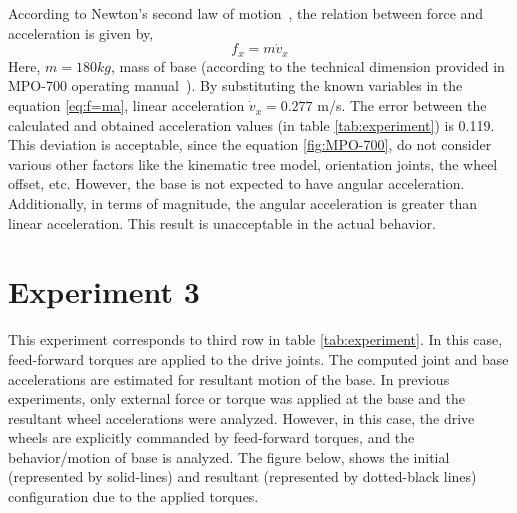 

According to Newton's second law of motion~\cite{newton1833philosophiae}, the relation between force and acceleration is given by,
\begin{equation}\label{eq:f=ma}
f_x = m \dot{v}_x
\end{equation}
Here, $m = 180kg$, mass of base (according to the technical dimension provided in MPO-700 operating manual~\cite{MPO700}). By substituting the known variables in the equation \ref{eq:f=ma}, linear acceleration $\dot{v}_x = 0.277$ m/s. The error between the calculated and obtained acceleration values (in table \ref{tab:experiment}) is 0.119. This deviation is acceptable, since the equation \ref{fig:MPO-700}, do not consider various other factors like the kinematic tree model, orientation joints, the wheel offset, etc. However, the base is not expected to have angular acceleration. Additionally, in terms of magnitude, the angular acceleration is greater than linear acceleration. This result is unacceptable in the actual behavior. 

\section{Experiment 3}

This experiment corresponds to third row in table \ref{tab:experiment}. In this case, feed-forward torques are applied to the drive joints. The computed joint and base accelerations are estimated for resultant motion of the base. In previous experiments, only external force or torque was applied at the base and the resultant wheel accelerations were analyzed. However, in this case, the drive wheels are explicitly commanded by feed-forward torques, and the behavior/motion of base is analyzed. The figure below, shows the initial (represented by solid-lines) and resultant (represented by dotted-black lines) configuration due to the applied torques. 


